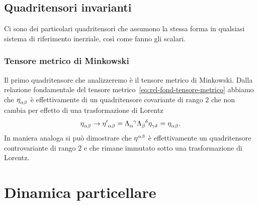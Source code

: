 \subsection{Quadritensori invarianti}
\label{sec:tensori-invarianti}

Ci sono dei particolari quadritensori che assumono la stessa forma in qualsiasi
sistema di riferimento inerziale, così come fanno gli scalari.

\subsubsection{Tensore metrico di Minkowski}
\label{sec:tensore-metrico}

Il primo quadritensore che analizzeremo è il tensore metrico di Minkowski.
Dalla relazione fondamentale del tensore
metrico~\eqref{eq:rel-fond-tensore-metrico} abbiamo che
$\tensor{\eta}{_{\alpha\beta}}$ è effettivamente di un quadritensore covariante
di rango $2$ che non cambia per effetto di una trasformazione di Lorentz
\begin{equation}
  \tensor{\eta}{_{\alpha\beta}} \to \tensor{{\eta'}}{_{\alpha\beta}} =
  \tensor{\Lambda}{_{\alpha}^{\gamma}} \tensor{\Lambda}{_{\beta}^{\delta}}
  \tensor{\eta}{_{\gamma\delta}} = \tensor{\eta}{_{\alpha\beta}}.
\end{equation}
In maniera analoga si può dimostrare che $\tensor{\eta}{^{\alpha\beta}}$ è
effettivamente un quadritensore controvariante di rango $2$ e che rimane
immutato sotto una trasformazione di Lorentz.

\section{Dinamica particellare}
\label{sec:dinamica-particellare}

